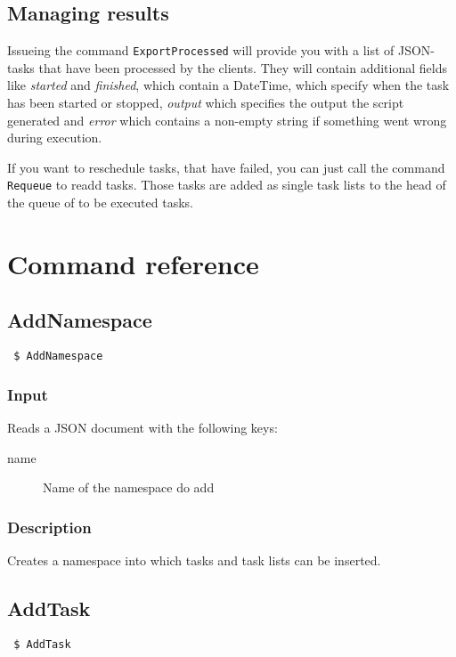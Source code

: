 \documentclass[a4paper,11pt]{article}
\begin{document}
\subsection{Managing results}
Issueing the command \texttt{ExportProcessed} will provide you with a list of JSON-tasks that have been processed by the clients. They will contain additional fields like \textit{started} and \textit{finished}, which contain a DateTime, which specify when the task has been started or stopped, \textit{output} which specifies the output the script generated and \textit{error} which contains a non-empty string if something went wrong during execution.

If you want to reschedule tasks, that have failed, you can just call the command \texttt{Requeue} to readd tasks. Those tasks are added as single task lists to the head of the queue of to be executed tasks.

\newpage

\section{Command reference}

\subsection{AddNamespace}
\begin{verbatim}
 $ AddNamespace
\end{verbatim}

\subsubsection{Input}
Reads a JSON document with the following keys:
\begin{description}
\item[name] Name of the namespace do add
\end{description}

\subsubsection{Description}
Creates a namespace into which tasks and task lists can be inserted.

\newpage


\subsection{AddTask\label{cmd:AddTask}}
\begin{verbatim}
 $ AddTask
\end{verbatim}
\end{document}
